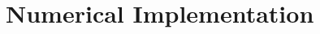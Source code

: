 \documentclass[aps,prd,twocolumn,superscriptaddress]{revtex4-1}
\begin{document}
\section{Numerical Implementation} \label{sec:numerics}
\begin{comment}


\begin{widetext}

\subsection{Classical field}

The classical field equations of motion are obtained by replacing the operators in equation \ref{Ham} with their expectation values. The classial field, $a^{cl}_p$ then evolves as  

\begin{align} \label{classicalFieldEqns}
    \partial_t a^{cl}_p = -i\left[ \omega_p a^{cl}_p + \sum_{ijl} \frac{\Lambda^{ij}_{pl} + \Lambda^{ij}_{lp}}{2} a^{cl\dagger}_l a^{cl}_i a^{cl}_j \right] \, .
\end{align}

\end{widetext}

The initial conditions used to approximate each quantum state are given as 
\begin{enumerate}
    \item Number eigenstate: $a^{cl}_p \biggr\rvert_{t=0} = \sqrt{ n_p }$. \\
    \item Coherent state: $a^{cl}_p \biggr\rvert_{t=0} = z_p$. \\
    \item Field number state: $a^{cl}_p \biggr\rvert_{t=0} = z_p$.
\end{enumerate}

Note that the initial values of the classical field in the number eigenstate case are real, for a discussion of how this effects classical convergence see \cite{Hertzberg2016}. The $n_p$ refer to the values in equation \ref{numEigenstate}. Likewise, $z_p$ refers to the values in equations \ref{coherentStates} and \ref{fieldNumState} for coherent states and field number states respectively.

The equations of motion, \ref{classicalFieldEqns}, are then integrated using a fourth order Runga-Kutta scheme. That is, the field at a time $t$ is sent to the field at a time $t + \Delta t$ by the following rule


\end{comment}
\end{document}
